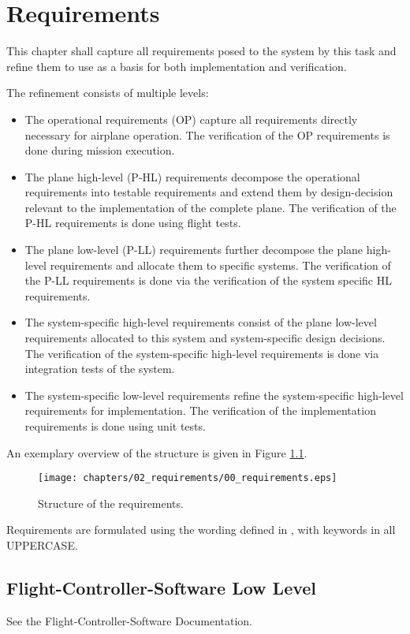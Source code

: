 \chapter{Requirements}
This chapter shall capture all requirements posed to the
system by this task and refine them to use as a basis for
both implementation and verification.

The refinement consists of multiple levels:
\begin{itemize}
    \item The operational requirements (OP) capture all requirements directly necessary for airplane operation.
        The verification of the OP requirements is done during mission execution.
    \item The plane high-level (P-HL) requirements decompose the operational requirements into testable requirements
        and extend them by design-decision relevant to the implementation of the complete plane.
        The verification of the P-HL requirements is done using flight tests.
    \item The plane low-level (P-LL) requirements further decompose the plane high-level requirements and allocate them to
        specific systems.
        The verification of the P-LL requirements is done via the verification of the system specific HL requirements.
    \item The system-specific high-level requirements consist of the plane low-level requirements allocated to this system
        and system-specific design decisions.
        The verification of the system-specific high-level requirements is done via integration tests of the system.
    \item The system-specific low-level requirements refine the system-specific high-level requirements 
        for implementation. 
        The verification of the implementation requirements is done using unit tests.
\end{itemize}

An exemplary overview of the structure is given in Figure \ref{fig:reqStructure}.

\begin{figure}[H]
    \centering
    \texttt{[image: chapters/02\_requirements/00\_requirements.eps]}
    \caption{Structure of the requirements.} 
    \label{fig:reqStructure}
\end{figure}

Requirements are formulated using the wording defined in \cite{rfc2119}, with keywords in all UPPERCASE.

\newpage





\section{Flight-Controller-Software Low Level}
See the Flight-Controller-Software Documentation.